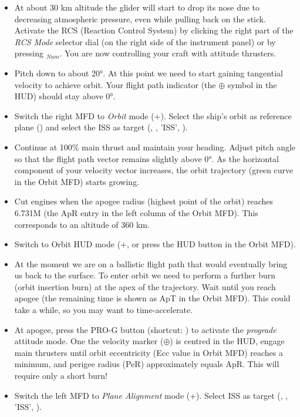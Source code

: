 \documentclass[Orbiter User Manual.tex]{subfiles}
\begin{document}
\begin{itemize}
\item At about 30 km altitude the glider will start to drop its nose due to decreasing atmospheric pressure, even while pulling back on the stick. Activate the RCS (Reaction Control System) by clicking the right part of the \textit{RCS Mode} selector dial (on the right side of the instrument panel) or by pressing \keystroke{/}$_{Num}$. You are now controlling your craft with attitude thrusters.
\item Pitch down to about 20°. At this point we need to start gaining tangential velocity to achieve orbit. Your flight path indicator (the $\oplus$ symbol in the HUD) should stay above 0°.
\item Switch the right MFD to \textit{Orbit} mode (\Shift{}+\Shift{}). Select the ship's orbit as reference plane (\Shift{}) and select the ISS as target (\Shift{}, \Enter, 'ISS', \Enter).
\item Continue at 100\% main thrust and maintain your heading. Adjust pitch angle so that the flight path vector remains slightly above 0°. As the horizontal component of your velocity vector increases, the orbit trajectory (green curve in the Orbit MFD) starts growing.
\item Cut engines when the apogee radius (highest point of the orbit) reaches 6.731M (the ApR entry in the left column of the Orbit MFD). This corresponds to an altitude of 360 km.
\item Switch to Orbit HUD mode (+, or press the HUD button in the Orbit MFD).
\item At the moment we are on a ballistic flight path that would eventually bring us back to the surface. To enter orbit we need to perform a further burn (orbit insertion burn) at the apex of the trajectory. Wait until you reach apogee (the remaining time is shown as ApT in the Orbit MFD). This could take a while, so you may want to time-accelerate.
\item At apogee, press the PRO-G button (shortcut: \keystroke{[}) to activate the \textit{prograde} attitude mode. One the velocity marker ($\oplus$) is centred in the HUD, engage main thrusters until orbit eccentricity (Ecc value in Orbit MFD) reaches a minimum, and perigee radius (PeR) approximately equals ApR. This will require only a short burn!
\item Switch the left MFD to \textit{Plane Alignment} mode (\Shift{}+\Shift{}). Select ISS as target (\Shift{}, \Enter, 'ISS', \Enter).

\end{itemize}
\end{document}
